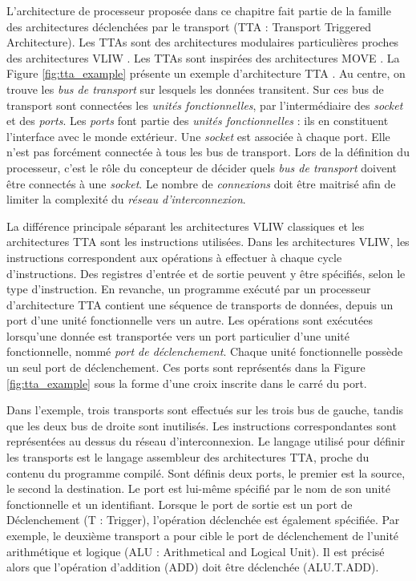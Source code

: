 L'architecture de processeur proposée dans ce chapitre fait partie de la famille des architectures déclenchées par le transport (TTA : Transport Triggered Architecture). Les TTAs sont des architectures modulaires particulières proches des architectures VLIW \cite{corporaal_microprocessor_1997}. Les TTAs sont inspirées des architectures MOVE \cite{1051344}. La Figure \ref{fig:tta_example} présente un exemple d'architecture TTA \cite{pekka_phd_2012}. Au centre, on trouve les \textit{bus de transport} sur lesquels les données transitent. Sur ces bus de transport sont connectées les \textit{unités fonctionnelles}, par l'intermédiaire des \textit{socket} et des \textit{ports}. Les \textit{ports} font partie des \textit{unités fonctionnelles} : ils en constituent l'interface avec le monde extérieur. Une \textit{socket} est associée à chaque port. Elle n'est pas forcément connectée à tous les bus de transport. Lors de la définition du processeur, c'est le rôle du concepteur de décider quels \textit{bus de transport} doivent être connectés à une \textit{socket}. Le nombre de \textit{connexions} doit être maitrisé afin de limiter la complexité du \textit{réseau d'interconnexion}.

La différence principale séparant les architectures VLIW classiques et les architectures TTA sont les instructions utilisées. Dans les architectures VLIW, les instructions correspondent aux opérations à effectuer à chaque cycle d'instructions. Des registres d'entrée et de sortie peuvent y être spécifiés, selon le type d'instruction. En revanche, un programme exécuté par un processeur d'architecture TTA contient une séquence de transports de données, depuis un port d'une unité fonctionnelle vers un autre. Les opérations sont exécutées lorsqu'une donnée est transportée vers un port particulier d'une unité fonctionnelle, nommé \textit{port de déclenchement}. Chaque unité fonctionnelle possède un seul port de déclenchement. Ces ports sont représentés dans la Figure \ref{fig:tta_example} sous la forme d'une croix inscrite dans le carré du port.

Dans l'exemple, trois transports sont effectués sur les trois bus de gauche, tandis que les deux bus de droite sont inutilisés. Les instructions correspondantes sont représentées au dessus du réseau d'interconnexion. Le langage utilisé pour définir les transports est le langage assembleur des architectures TTA, proche du contenu du programme compilé. Sont définis deux ports, le premier est la source, le second la destination. Le port est lui-même spécifié par le nom de son unité fonctionnelle et un identifiant. Lorsque le port de sortie est un port de Déclenchement (T : Trigger), l'opération déclenchée est également spécifiée. Par exemple, le deuxième transport a pour cible le port de déclenchement de l'unité arithmétique et logique (ALU : Arithmetical and Logical Unit). Il est précisé alors que l'opération d'addition (ADD) doit être déclenchée (ALU.T.ADD).

